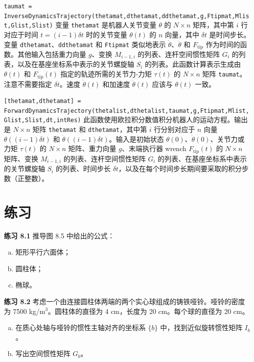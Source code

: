 \documentclass[12pt,a4paper]{article}
\begin{document}
\texttt{taumat = InverseDynamicsTrajectory(thetamat,dthetamat,ddthetamat,g,Ftipmat,Mlist,Glist,Slist)} 变量 \texttt{thetamat} 是机器人关节变量 $\theta$ 的 $N \times n$ 矩阵，其中第 $i$ 行对应于时间 $t = (i-1)\delta t$ 时的关节变量 $\theta(t)$ 的 $n$ 向量，其中 $\delta t$ 是时间步长。变量 \texttt{dthetamat}、\texttt{ddthetamat} 和 \texttt{Ftipmat} 类似地表示 $\dot{\theta}$、$\ddot{\theta}$ 和 $F_{\text{tip}}$ 作为时间的函数。其他输入包括重力向量 $g$、变换 $M_{i-1,i}$ 的列表、连杆空间惯性矩阵 $G_i$ 的列表，以及在基座坐标系中表示的关节螺旋轴 $S_i$ 的列表。此函数计算表示生成由 $\theta(t)$ 和 $F_{\text{tip}}(t)$ 指定的轨迹所需的关节力-力矩 $\tau(t)$ 的 $N \times n$ 矩阵 \texttt{taumat}。注意不需要指定 $\delta t$。速度 $\dot{\theta}(t)$ 和加速度 $\ddot{\theta}(t)$ 应该与 $\theta(t)$ 一致。

\texttt{[thetamat,dthetamat] = ForwardDynamicsTrajectory(thetalist,dthetalist,taumat,g,Ftipmat,Mlist,Glist,Slist,dt,intRes)} 此函数使用欧拉积分数值积分机器人的运动方程。输出是 $N \times n$ 矩阵 \texttt{thetamat} 和 \texttt{dthetamat}，其中第 $i$ 行分别对应于 $n$ 向量 $\theta((i-1)\delta t)$ 和 $\dot{\theta}((i-1)\delta t)$。输入是初始状态 $\theta(0)$、$\dot{\theta}(0)$、关节力或力矩 $\tau(t)$ 的 $N \times n$ 矩阵、重力向量 $g$、末端执行器 wrench $F_{\text{tip}}(t)$ 的 $N \times n$ 矩阵、变换 $M_{i-1,i}$ 的列表、连杆空间惯性矩阵 $G_i$ 的列表、在基座坐标系中表示的关节螺旋轴 $S_i$ 的列表、时间步长 $\delta t$，以及在每个时间步长期间要采取的积分步数（正整数）。

\section{练习}

\textbf{练习 8.1} 推导图 8.5 中给出的公式：
\begin{enumerate}[(a)]
\item 矩形平行六面体；
\item 圆柱体；
\item 椭球。
\end{enumerate}

\textbf{练习 8.2} 考虑一个由连接圆柱体两端的两个实心球组成的铸铁哑铃。哑铃的密度为 7500 kg/m$^3$。圆柱体的直径为 4 cm，长度为 20 cm。每个球的直径为 20 cm。
\begin{enumerate}[(a)]
\item 在质心处轴与哑铃的惯性主轴对齐的坐标系 $\{b\}$ 中，找到近似旋转惯性矩阵 $I_b$。
\item 写出空间惯性矩阵 $G_b$。
\end{enumerate}
\end{document}

